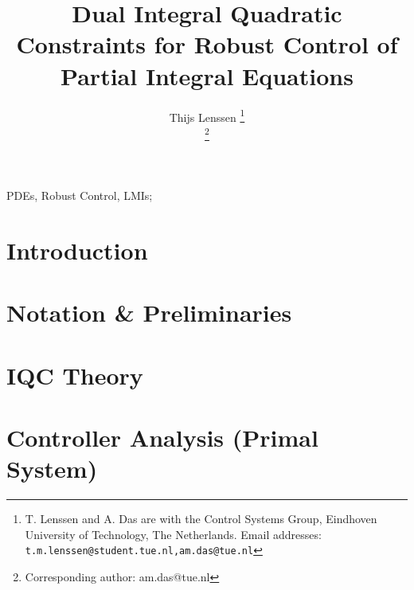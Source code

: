 \documentclass[journal,10pt,twocolumn,twoside, a4paper]{IEEEtran}
\begin{document}
\title{Dual Integral Quadratic Constraints for Robust Control of Partial Integral Equations}

\author{Thijs Lenssen%
\thanks{T. Lenssen and A. Das are with the Control Systems Group, Eindhoven
University of Technology, The Netherlands. Email addresses:
\small{\tt\small{t.m.lenssen@student.tue.nl,am.das@tue.nl}}}

\thanks{Corresponding author: am.das@tue.nl}}%

\maketitle

\begin{abstract}
\end{abstract}
\begin{IEEEkeywords}
PDEs, Robust Control, LMIs;
\end{IEEEkeywords}
\section{Introduction}

\section{Notation \& Preliminaries}


\section{IQC Theory}\label{sec:iqc-theory}


\section{Controller Analysis (Primal System)}\label{sec:primal-controller-analysis}
\primalsystemcomponents

\end{document}
